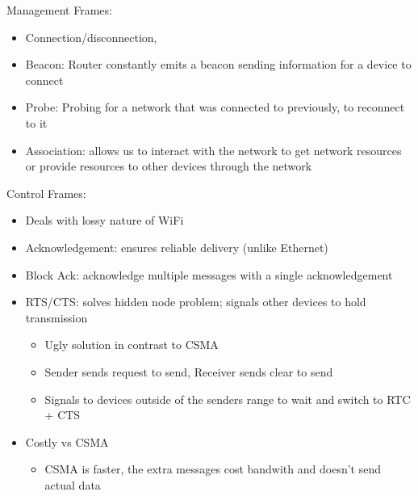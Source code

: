 \documentclass{article}
\begin{document}
Management Frames:
\begin{itemize}
        \item Connection/disconnection, 
        \item Beacon: Router constantly emits a beacon sending information for a device
        to connect
        \item Probe: Probing for a network that was connected to previously, to reconnect
        to it
        \item Association: allows us to interact with the network to get network resources or provide resources to other devices through the network
    \end{itemize}
    Control Frames:
    \begin{itemize}
        \item Deals with lossy nature of WiFi 
        \item Acknowledgement: ensures reliable delivery (unlike Ethernet)
        \item Block Ack: acknowledge multiple messages with a single acknowledgement
        \item RTS/CTS: solves hidden node problem; signals other devices to hold transmission
        \begin{itemize}
            \item Ugly solution in contrast to CSMA
            \item Sender sends request to send, Receiver sends clear to send
            \item Signals to devices outside of the senders range to wait and
            switch to RTC + CTS
        \end{itemize}
        \item Costly vs CSMA 
        \begin{itemize}
            \item CSMA is faster, the extra messages cost bandwith and doesn’t
            send actual data
        \end{itemize}
    \end{itemize}
\end{document}
